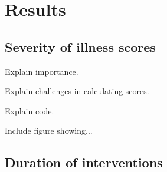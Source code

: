 \documentclass{elsart}
\begin{document}







\section{Results}

\subsection{Severity of illness scores}

Explain importance.

Explain challenges in calculating scores.

Explain code.

Include figure showing...

\subsection{Duration of interventions}
\end{document}

